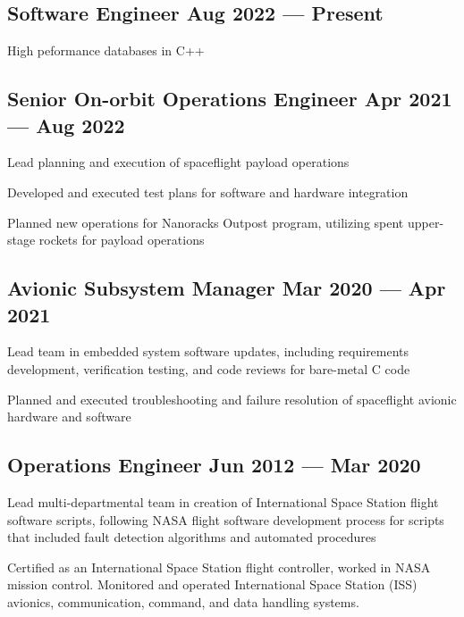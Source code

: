 \documentclass[letter,10pt]{article}
\begin{document}
\subsection{{Software Engineer \hfill Aug 2022 --- Present}}
\begin{zitemize}
\item High peformance databases in C++
\end{zitemize}

\subsection{{Senior On-orbit Operations Engineer \hfill Apr 2021 --- Aug 2022}}
\begin{zitemize}
\item Lead planning and execution of spaceflight payload operations
\item Developed and executed test plans for software and hardware integration
\item Planned new operations for Nanoracks Outpost program, utilizing spent upper-stage rockets for payload operations
\end{zitemize}

\subsection{{Avionic Subsystem Manager \hfill Mar 2020 --- Apr 2021}}
\begin{zitemize}
\item Lead team in embedded system software updates, including requirements development, verification testing, and code reviews for bare-metal C code
\item Planned and executed troubleshooting and failure resolution of spaceflight avionic hardware and software
\end{zitemize}

\subsection{{Operations Engineer \hfill Jun 2012 --- Mar 2020}}
\begin{zitemize}
\item Lead multi-departmental team in creation of International Space Station flight software scripts, following NASA flight software development process for scripts that included fault detection algorithms and automated procedures
\item Certified as an International Space Station flight controller, worked in NASA mission control.
Monitored and operated International Space Station (ISS) avionics, communication, command, and
data handling systems.
\end{zitemize}
\end{document}
